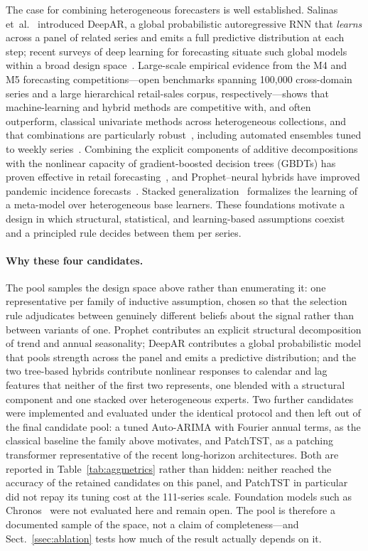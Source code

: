 \documentclass[runningheads]{llncs}
\begin{document}
The case for combining heterogeneous forecasters is well established.
Salinas et~al.~\cite{salinas2020} introduced DeepAR, a global
probabilistic autoregressive RNN that \emph{learns} across a panel of
related series and emits a full predictive
distribution at each step; recent surveys of deep learning for
forecasting situate such global models within a broad design
space~\cite{benidis2022,hewamalage2021,lim2021}. Large-scale
empirical evidence from the M4 and M5 forecasting competitions---open
benchmarks spanning 100{,}000 cross-domain series and a
large hierarchical retail-sales corpus, respectively---shows that
machine-learning and hybrid methods are competitive with, and often
outperform, classical univariate methods across heterogeneous
collections, and that combinations are particularly
robust~\cite{makridakis2020,makridakis2022}, including automated
ensembles tuned to weekly series~\cite{godahewa2023}. Combining the explicit
components of additive decompositions with the nonlinear capacity of
gradient-boosted decision trees (GBDTs) has proven effective in
retail forecasting~\cite{makridakis2022}, and Prophet--neural
hybrids have improved pandemic incidence forecasts~\cite{dash2024}. Stacked
generalization~\cite{wolpert1992} formalizes the learning of a meta-model
over heterogeneous base learners. These foundations motivate a
design in which structural, statistical, and learning-based
assumptions coexist and a principled rule decides between them per
series.

\paragraph{Why these four candidates.}
The pool samples the design space above rather than enumerating it: one
representative per family of inductive assumption, chosen so that the
selection rule adjudicates between genuinely different beliefs about the
signal rather than between variants of one. Prophet contributes an
explicit structural decomposition of trend and annual seasonality;
DeepAR contributes a global probabilistic model that pools strength
across the panel and emits a predictive distribution; and the two
tree-based hybrids contribute nonlinear responses to calendar and lag
features that neither of the first two represents, one blended with a
structural component and one stacked over heterogeneous experts. Two
further candidates were implemented and evaluated under the identical
protocol and then left out of the final candidate pool: a tuned Auto-ARIMA with
Fourier annual terms, as the classical baseline the family above
motivates, and PatchTST, as a patching transformer representative of the
recent long-horizon architectures. Both are reported in
Table~\ref{tab:aggmetrics} rather than hidden: neither reached the
accuracy of the retained candidates on this panel, and PatchTST in
particular did not repay its tuning cost at the 111-series scale.
Foundation models such as Chronos~\cite{ansari2024chronos} were not
evaluated here and remain open. The pool is therefore a documented
sample of the space, not a claim of completeness---and
Sect.~\ref{ssec:ablation} tests how much of the result actually depends
on it.
\end{document}
